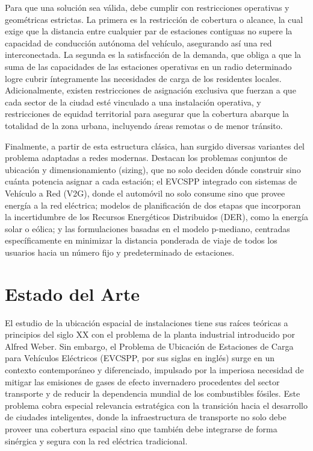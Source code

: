 \documentclass[letter, 10pt]{article}
\begin{document}
Para que una soluci\'on sea v\'alida, debe cumplir con restricciones operativas y geom\'etricas estrictas. La primera es la restricci\'on de cobertura o alcance, la cual exige que la distancia entre cualquier par de estaciones contiguas no supere la capacidad de conducci\'on aut\'onoma del veh\'iculo, asegurando as\'i una red interconectada. La segunda es la satisfacci\'on de la demanda, que obliga a que la suma de las capacidades de las estaciones operativas en un radio determinado logre cubrir \'integramente las necesidades de carga de los residentes locales\cite{1_Solving_optimal_evcsp_problem_QUANTUM}. Adicionalmente, existen restricciones de asignaci\'on exclusiva que fuerzan a que cada sector de la ciudad est\'e vinculado a una instalaci\'on operativa, y restricciones de equidad territorial para asegurar que la cobertura abarque la totalidad de la zona urbana, incluyendo \'areas remotas o de menor tr\'ansito\cite{1_Solving_optimal_evcsp_problem_QUANTUM}.

Finalmente, a partir de esta estructura cl\'asica, han surgido diversas variantes del problema adaptadas a redes modernas. Destacan los problemas conjuntos de ubicaci\'on y dimensionamiento (sizing), que no solo deciden d\'onde construir sino cu\'anta potencia asignar a cada estaci\'on\cite{2_EVCSP_2013-ieee-conference}; el EVCSPP integrado con sistemas de Veh\'iculo a Red (V2G), donde el autom\'ovil no solo consume sino que provee energ\'ia a la red el\'ectrica\cite{2_EVCSP_2013-ieee-conference}; modelos de planificaci\'on de dos etapas que incorporan la incertidumbre de los Recursos Energ\'eticos Distribuidos (DER), como la energ\'ia solar o e\'olica\cite{3_optimal_placement-metaheuristic}; y las formulaciones basadas en el modelo p-mediano, centradas espec\'ificamente en minimizar la distancia ponderada de viaje de todos los usuarios hacia un n\'umero fijo y predeterminado de estaciones\cite{3_optimal_placement-metaheuristic}.


\section{Estado del Arte}


El estudio de la ubicación espacial de instalaciones tiene sus raíces teóricas a principios del siglo XX con el problema de la planta industrial introducido por Alfred Weber\cite{4_survey_FLP}. Sin embargo, el Problema de Ubicación de Estaciones de Carga para Vehículos Eléctricos (EVCSPP, por sus siglas en inglés) surge en un contexto contemporáneo y diferenciado, impulsado por la imperiosa necesidad de mitigar las emisiones de gases de efecto invernadero procedentes del sector transporte y de reducir la dependencia mundial de los combustibles fósiles\cite{7_recent_trends_optimization_techniques}. Este problema cobra especial relevancia estratégica con la transición hacia el desarrollo de ciudades inteligentes, donde la infraestructura de transporte no solo debe proveer una cobertura espacial sino que también debe integrarse de forma sinérgica y segura con la red eléctrica tradicional\cite{6_EVCSP_formulation_complexity}.
\end{document}
